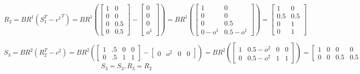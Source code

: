 \documentclass{article}
\begin{document}
\begin{equation*}
R_2=
BR^1(S_1^T-{c^1}^T)=
BR^1(
\begin{bmatrix}
1 & 0\\
0 & 0\\
0 & 0.5\\
0 & 0.5
\end{bmatrix}
-
\begin{bmatrix}
0 \\
0 \\
0 \\
o^1
\end{bmatrix}
)
=
BR^1(
\begin{bmatrix}
1 & 0\\
0 & 0\\
0 & 0.5\\
0-o^1 & 0.5-o^1
\end{bmatrix}
)
=
\begin{bmatrix}
1 & 0\\
0.5 & 0.5\\
0 & 1\\
0 & 1
\end{bmatrix}
\end{equation*}

\begin{equation*}
S_3=
BR^2(R_2^T-c^2)=
BR^2(
\begin{bmatrix}
1 & .5 & 0 & 0\\
0 & .5 & 1 & 1
\end{bmatrix}
-
\begin{bmatrix}
0 & o^2 & 0 & 0
\end{bmatrix}
)
=
BR^2(
\begin{bmatrix}
 1      & 0.5-o^2   & 0  & 0   \\
0     & 0.5-o^2   & 1      & 1 
\end{bmatrix}
)
=
\begin{bmatrix}
1 & 0 & 0 & 0\\
0 & 0 & 0.5 & 0.5
\end{bmatrix}
\end{equation*}
\begin{equation*}
S_3=S_2,
R_3=R_2
\end{equation*}
\end{document}
